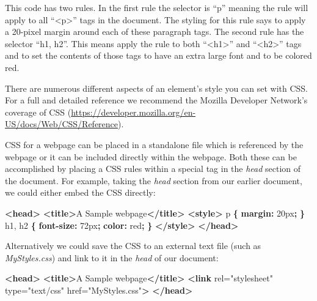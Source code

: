 \documentclass[]{memoir}
\newenvironment{Shaded}{}{}
\newcommand{\KeywordTok}[1]{\textcolor[rgb]{0.00,0.44,0.13}{\textbf{{#1}}}}
\newcommand{\DataTypeTok}[1]{\textcolor[rgb]{0.56,0.13,0.00}{{#1}}}
\newcommand{\StringTok}[1]{\textcolor[rgb]{0.25,0.44,0.63}{{#1}}}
\newcommand{\OtherTok}[1]{\textcolor[rgb]{0.00,0.44,0.13}{{#1}}}
\newcommand{\NormalTok}[1]{{#1}}
\begin{document}
This code has two rules. In the first rule the selector is ``p'' meaning
the rule will apply to all ``\textless{}p\textgreater{}'' tags in the
document. The styling for this rule says to apply a 20-pixel margin
around each of these paragraph tags. The second rule has the selector
``h1, h2''. This means apply the rule to both
``\textless{}h1\textgreater{}'' and ``\textless{}h2\textgreater{}'' tags
and to set the contents of those tags to have an extra large font and to
be colored red.

There are numerous different aspects of an element's style you can set
with CSS. For a full and detailed reference we recommend the Mozilla
Developer Network's coverage of CSS
(\url{https://developer.mozilla.org/en-US/docs/Web/CSS/Reference}).

CSS for a webpage can be placed in a standalone file which is referenced
by the webpage or it can be included directly within the webpage. Both
these can be accomplished by placing a CSS rules within a special tag in
the \emph{head} section of the document. For example, taking the
\emph{head} section from our earlier document, we could either embed the
CSS directly:

\begin{Shaded}
\begin{Highlighting}[]
\KeywordTok{<head>}
    \KeywordTok{<title>}\NormalTok{A Sample webpage}\KeywordTok{</title>}
    \KeywordTok{<style>}
        \NormalTok{p }\KeywordTok{\{}
            \KeywordTok{margin:} \DataTypeTok{20px}\KeywordTok{;}
        \KeywordTok{\}}
        \NormalTok{h1, h2 }\KeywordTok{\{}
            \KeywordTok{font-size:} \DataTypeTok{72px}\KeywordTok{;}
            \KeywordTok{color:} \DataTypeTok{red}\KeywordTok{;}
        \KeywordTok{\}}
    \KeywordTok{</style>}
\KeywordTok{</head>}
\end{Highlighting}
\end{Shaded}

Alternatively we could save the CSS to an external text file (such as
\emph{MyStyles.css}) and link to it in the \emph{head} of our document:

\begin{Shaded}
\begin{Highlighting}[]
\KeywordTok{<head>}
    \KeywordTok{<title>}\NormalTok{A Sample webpage}\KeywordTok{</title>}
    \KeywordTok{<link}\OtherTok{ rel=}\StringTok{"stylesheet"}\OtherTok{ type=}\StringTok{"text/css"}\OtherTok{ href=}\StringTok{"MyStyles.css"}\KeywordTok{>}
\KeywordTok{</head>}
\end{Highlighting}
\end{Shaded}
\end{document}
